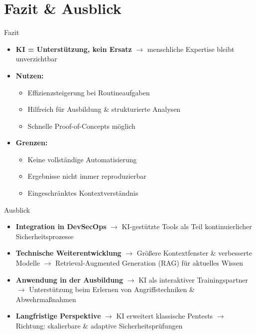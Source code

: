 \documentclass[
	aspectratio=169,	%
	onlytextwidth,		%
	t,					%
	]{beamer}
\begin{document}
\section{Fazit \& Ausblick}
\begin{frame}{Fazit}
	\begin{itemize}
		\item \textbf{KI = Unterstützung, kein Ersatz}  
		$\rightarrow$  menschliche Expertise bleibt unverzichtbar
		
		\item \textbf{Nutzen:}
		\begin{itemize}
			\item Effizienzsteigerung bei Routineaufgaben
			\item Hilfreich für Ausbildung \& strukturierte Analysen
			\item Schnelle Proof-of-Concepts möglich
		\end{itemize}
		
		\item \textbf{Grenzen:}
		\begin{itemize}
			\item Keine vollständige Automatisierung
			\item Ergebnisse nicht immer reproduzierbar
			\item Eingeschränktes Kontextverständnis
		\end{itemize}
	\end{itemize}
\end{frame}





\begin{frame}{Ausblick}
	\begin{itemize}
		\item \textbf{Integration in DevSecOps}  
		$\rightarrow$  KI-gestützte Tools als Teil kontinuierlicher Sicherheitsprozesse
		
		\item \textbf{Technische Weiterentwicklung}  
		$\rightarrow$  Größere Kontextfenster \& verbesserte Modelle  
		$\rightarrow$  Retrieval-Augmented Generation (RAG) für aktuelles Wissen
		
		\item \textbf{Anwendung in der Ausbildung}  
		$\rightarrow$  KI als interaktiver Trainingspartner  
		$\rightarrow$  Unterstützung beim Erlernen von Angriffstechniken \& Abwehrmaßnahmen
		
		\item \textbf{Langfristige Perspektive}  
		$\rightarrow$  KI erweitert klassische Pentests  
		$\rightarrow$  Richtung: skalierbare \& adaptive Sicherheitsprüfungen
	\end{itemize}
\end{frame}
\end{document}
